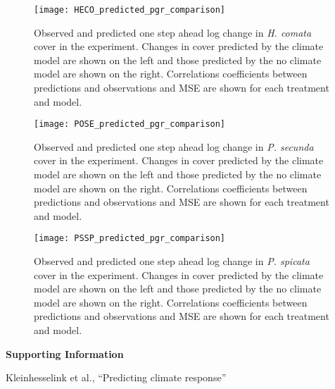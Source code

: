 \documentclass[11pt]{article}
\begin{document}
\begin{figure}[!htbp]
	\centering
	\texttt{[image: HECO\_predicted\_pgr\_comparison]}
	\caption{Observed and predicted one step ahead log change in \textit{H. comata} cover in the experiment. Changes in cover predicted by the climate model are shown on the left and those predicted by the no climate model are shown on the right. Correlations coefficients between predictions and observations and MSE are shown for each treatment and model. }
	\label{fig:pgrHECO}
\end{figure}

\begin{figure}[!htbp]
	\centering
	\texttt{[image: POSE\_predicted\_pgr\_comparison]}
	\caption{Observed and predicted one step ahead log change in \textit{P. secunda} cover in the experiment. Changes in cover predicted by the climate model are shown on the left and those predicted by the no climate model are shown on the right. Correlations coefficients between predictions and observations and MSE are shown for each treatment and model.}
	\label{fig:pgrPOSE}
\end{figure}

\begin{figure}[!htbp]
	\centering
	\texttt{[image: PSSP\_predicted\_pgr\_comparison]}
	\caption{Observed and predicted one step ahead log change in \textit{P. spicata} cover in the experiment. Changes in cover predicted by the climate model are shown on the left and those predicted by the no climate model are shown on the right. Correlations coefficients between predictions and observations and MSE are shown for each treatment and model.}
	\label{fig:pgrPSSP}
\end{figure}




\clearpage 
\newpage 



\clearpage 
\newpage 

\setcounter{page}{1}
\setcounter{equation}{0}
\setcounter{figure}{0}
\setcounter{section}{0}
\setcounter{table}{0}
\renewcommand{\theequation}{SI.\arabic{equation}}
\renewcommand{\thetable}{SI-\arabic{table}}
\renewcommand{\thefigure}{SI-\arabic{figure}}
\renewcommand{\thesection}{Section SI.\arabic{section}}

\centerline{\Large \textbf{Supporting Information }}
\centerline{Kleinhesselink et al., ``Predicting climate response''} 
\end{document}
